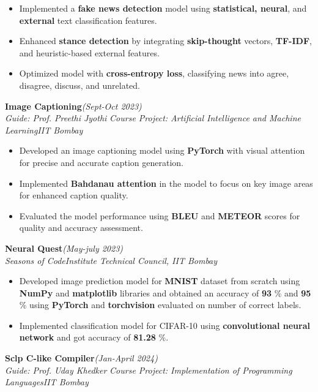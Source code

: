 \documentclass[10 pt]{article}
\begin{document}
		\begin{itemize}[itemsep = -0.8 mm, leftmargin=*]
		\vspace{-16pt}
      \item Implemented a \textbf{fake news detection} model using \textbf{statistical, neural}, and \textbf{external} text classification features.
      \item Enhanced \textbf{stance detection} by integrating \textbf{skip-thought} vectors, \textbf{TF-IDF}, and heuristic-based external features.
      \item Optimized model with \textbf{cross-entropy loss}, classifying news into agree, disagree, discuss, and unrelated.
	\end{itemize}
{\selectfont
		\textbf{{Image Captioning}}\hfill{\sl \small (Sept-Oct 2023)}\\
	}{\it Guide: Prof. Preethi Jyothi \textbar} {\it Course Project: Artificial Intelligence and Machine Learning}\hfill{\sl \small IIT Bombay}\\
		\begin{itemize}[itemsep = -0.8 mm, leftmargin=*]
		\vspace{-16pt}
    \item Developed an image captioning model using \textbf{PyTorch} with visual attention for precise and accurate caption generation.
    
    \item Implemented \textbf{Bahdanau attention} in the model to focus on key image areas for enhanced caption quality.
    \item Evaluated the model performance using \textbf{BLEU} and \textbf{METEOR} scores for quality and accuracy assessment.
	\end{itemize}
{\selectfont
		\textbf{{Neural Quest}}\hfill{\sl \small (May-july 2023)}\\
	}{\it Seasons of Code}\hfill{\sl \small Institute Technical Council, IIT Bombay}\\

		\begin{itemize}[itemsep = -0.8 mm, leftmargin=*]
		\vspace{-16pt}
		\item Developed image prediction model for \textbf{MNIST} dataset from scratch using \textbf{NumPy} and \textbf{matplotlib} libraries
  and obtained an accuracy of \textbf{93} \% and \textbf{95} \% using \textbf{PyTorch} and \textbf{torchvision} evaluated on number of correct labels.
		\item Implemented classification model for CIFAR-10 using \textbf{convolutional neural network} and got accuracy of \textbf{81.28} \%.
	\end{itemize}
{\selectfont
		\textbf{{Sclp C-like Compiler}}\hfill{\sl \small (Jan-April 2024)}\\
	}{\it Guide: Prof. Uday Khedker \textbar} {\it Course Project: Implementation of Programming Languages}\hfill{\sl \small IIT Bombay}\\
\end{document}
